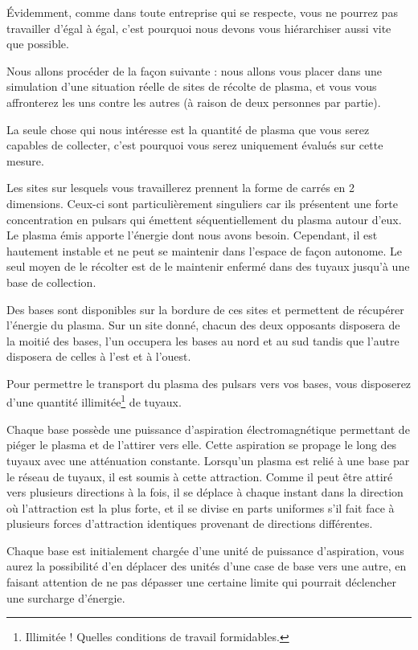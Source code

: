Évidemment, comme dans toute entreprise qui se respecte, vous ne pourrez pas
travailler d'égal à égal, c'est pourquoi nous devons vous hiérarchiser aussi
vite que possible.

Nous allons procéder de la façon suivante : nous allons vous placer dans une
simulation d'une situation réelle de sites de récolte de plasma, et vous vous
affronterez les uns contre les autres (à raison de deux personnes par partie).

La seule chose qui nous intéresse est la quantité de plasma que vous serez
capables de collecter, c'est pourquoi vous serez uniquement évalués sur cette
mesure.

Les sites sur lesquels vous travaillerez prennent la forme de carrés en 2
dimensions. Ceux-ci sont particulièrement singuliers car ils présentent une
forte concentration en pulsars qui émettent séquentiellement du plasma autour
d'eux. Le plasma émis apporte l'énergie dont nous avons besoin. Cependant, il
est hautement instable et ne peut se maintenir dans l'espace de façon autonome.
Le seul moyen de le récolter est de le maintenir enfermé dans des tuyaux
jusqu'à une base de collection.

Des bases sont disponibles sur la bordure de ces sites et permettent de
récupérer l'énergie du plasma. Sur un site donné, chacun des deux opposants
disposera de la moitié des bases, l'un occupera les bases au nord et au sud
tandis que l'autre disposera de celles à l'est et à l'ouest.

Pour permettre le transport du plasma des pulsars vers vos bases, vous
disposerez d'une quantité illimitée\footnote{Illimitée ! Quelles conditions de
travail formidables.} de tuyaux.

Chaque base possède une puissance d'aspiration électromagnétique permettant de
piéger le plasma et de l'attirer vers elle. Cette aspiration se propage le long
des tuyaux avec une atténuation constante.  Lorsqu'un plasma est relié à une
base par le réseau de tuyaux, il est soumis à cette attraction. Comme il peut
être attiré vers plusieurs directions à la fois, il se déplace à chaque instant
dans la direction où l'attraction est la plus forte, et il se divise en parts
uniformes s'il fait face à plusieurs forces d'attraction identiques provenant
de directions différentes.

Chaque base est initialement chargée d'une unité de puissance d'aspiration,
vous aurez la possibilité d'en déplacer des unités d'une case de base vers une
autre, en faisant attention de ne pas dépasser une certaine limite qui pourrait
déclencher une surcharge d'énergie.

